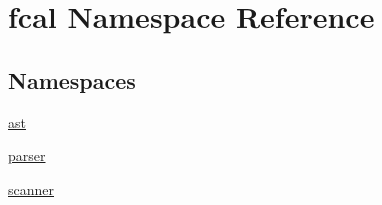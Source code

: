 \hypertarget{namespacefcal}{}\section{fcal Namespace Reference}
\label{namespacefcal}
\subsection*{Namespaces}
\begin{DoxyCompactItemize}
\item 
 \hyperlink{namespacefcal_1_1ast}{ast}
\item 
 \hyperlink{namespacefcal_1_1parser}{parser}
\item 
 \hyperlink{namespacefcal_1_1scanner}{scanner}
\end{DoxyCompactItemize}
